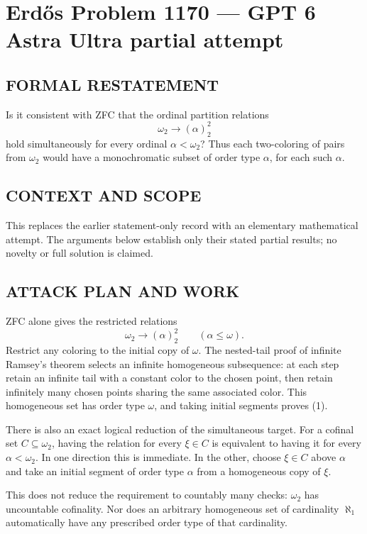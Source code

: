 \section*{Erd\H{o}s Problem 1170 --- GPT 6 Astra Ultra partial attempt}


\subsection*{FORMAL RESTATEMENT}
Is it consistent with ZFC that the ordinal partition relations
\[
\omega_2\longrightarrow(\alpha)^2_2
\]
hold simultaneously for every ordinal $\alpha<\omega_2$? Thus each two-coloring of pairs from $\omega_2$ would have a monochromatic subset of order type $\alpha$, for each such $\alpha$.

\subsection*{CONTEXT AND SCOPE}
This replaces the earlier statement-only record with an elementary mathematical attempt. The arguments below establish only their stated partial results; no novelty or full solution is claimed.

\subsection*{ATTACK PLAN AND WORK}
ZFC alone gives the restricted relations
\[\omega_2\longrightarrow(\alpha)^2_2\qquad(\alpha\le\omega).\tag{1}\]
Restrict any coloring to the initial copy of $\omega$. The nested-tail proof of
infinite Ramsey's theorem selects an infinite homogeneous subsequence: at each
step retain an infinite tail with a constant color to the chosen point, then
retain infinitely many chosen points sharing the same associated color. This
homogeneous set has order type $\omega$, and taking initial segments proves (1).

There is also an exact logical reduction of the simultaneous target. For a
cofinal set $C\subseteq\omega_2$, having the relation for every $\xi\in C$ is
equivalent to having it for every $\alpha<\omega_2$. In one direction this is
immediate. In the other, choose $\xi\in C$ above $\alpha$ and take an initial
segment of order type $\alpha$ from a homogeneous copy of $\xi$.

This does not reduce the requirement to countably many checks: $\omega_2$ has
uncountable cofinality. Nor does an arbitrary homogeneous set of cardinality
$\aleph_1$ automatically have any prescribed order type of that cardinality.

